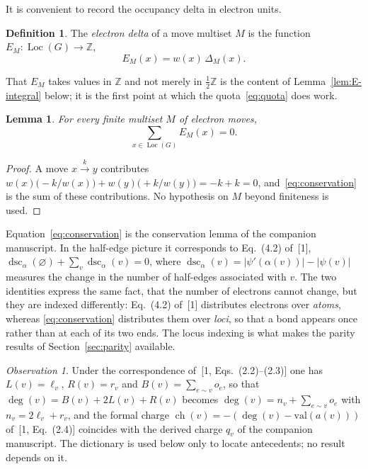 \documentclass[11pt]{article}
\numberwithin{equation}{section}
\newcommand{\Loc}{\operatorname{Loc}}
\newcommand{\ch}{\operatorname{ch}}
\newcommand{\dsc}{\operatorname{dsc}}
\theoremstyle{plain}
\newtheorem{lemma}[theorem]{Lemma}
\theoremstyle{definition}
\newtheorem{definition}[theorem]{Definition}
\theoremstyle{remark}
\newtheorem{observation}{Observation}
\begin{document}
It is convenient to record the occupancy delta in electron units.

\begin{definition}
\label{def:electron-delta}
The \emph{electron delta} of a move multiset $M$ is the function
$E_M\colon\Loc(G)\to\mathbb Z$,
\begin{equation}
  E_M(x)=w(x)\,\Delta_M(x) .
  \label{eq:electron-delta}
\end{equation}
\end{definition}

That $E_M$ takes values in $\mathbb Z$ and not merely in $\tfrac12\mathbb Z$ is
the content of Lemma~\ref{lem:E-integral} below; it is the first point at
which the quota~\eqref{eq:quota} does work.

\begin{lemma}
\label{lem:conservation}
For every finite multiset $M$ of electron moves,
\begin{equation}
  \sum_{x\in\Loc(G)}E_M(x)=0 .
  \label{eq:conservation}
\end{equation}
\end{lemma}

\begin{proof}
A move $x\xrightarrow{k}y$ contributes $w(x)\bigl(-k/w(x)\bigr)
+w(y)\bigl(+k/w(y)\bigr)=-k+k=0$, and~\eqref{eq:conservation} is the sum of
these contributions.  No hypothesis on $M$ beyond finiteness is used.
\end{proof}

Equation~\eqref{eq:conservation} is the conservation lemma of the companion
manuscript.  In the half-edge picture it corresponds to Eq.~(4.2) of~[1],
$\dsc_\alpha(\varnothing)+\sum_{v}\dsc_\alpha(v)=0$, where
$\dsc_\alpha(v)=|\psi'(\alpha(v))|-|\psi(v)|$ measures the change in the number
of half-edges associated with $v$.  The two identities express the same fact,
that the number of electrons cannot change, but they are indexed differently:
Eq.~(4.2) of~[1] distributes electrons over \emph{atoms}, whereas
\eqref{eq:conservation} distributes them over \emph{loci}, so that a bond
appears once rather than at each of its two ends.  The locus indexing is what
makes the parity results of Section~\ref{sec:parity} available.

\begin{observation}
\label{obs:heg-dict}
Under the correspondence of~[1, Eqs.~(2.2)--(2.3)] one has $L(v)=\ell_v$,
$R(v)=r_v$ and $B(v)=\sum_{e\sim v}o_e$, so that $\deg(v)=B(v)+2L(v)+R(v)$
becomes $\deg(v)=n_v+\sum_{e\sim v}o_e$ with $n_v=2\ell_v+r_v$, and the formal
charge $\ch(v)=-(\deg(v)-\mathrm{val}(a(v)))$ of~[1, Eq.~(2.4)] coincides with
the derived charge $q_v$ of the companion manuscript.  The dictionary is used
below only to locate antecedents; no result depends on it.
\end{observation}
\end{document}
